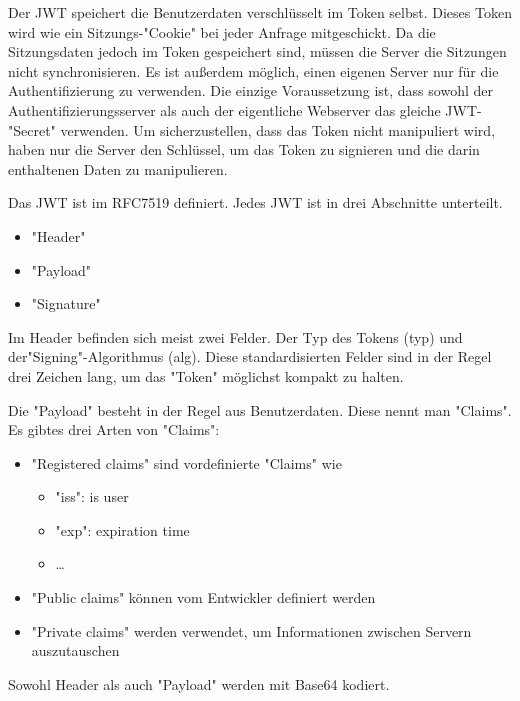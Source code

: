\label{sec:jwt}

Der JWT speichert die Benutzerdaten verschlüsselt im Token selbst. Dieses Token wird wie ein Sitzungs-"Cookie" bei jeder Anfrage mitgeschickt. Da die Sitzungsdaten jedoch im Token gespeichert sind, müssen die Server die Sitzungen nicht synchronisieren. Es ist außerdem möglich, einen eigenen Server nur für die Authentifizierung zu verwenden. 
Die einzige Voraussetzung ist, dass sowohl der Authentifizierungsserver als auch der eigentliche Webserver das gleiche JWT-"Secret" verwenden. Um sicherzustellen, dass das Token nicht manipuliert wird, haben nur die Server den Schlüssel, um das Token zu signieren und die darin enthaltenen Daten zu manipulieren. 

Das JWT ist im RFC7519 definiert. Jedes JWT ist in drei Abschnitte unterteilt. 

\begin{itemize}
    \item "Header"
    \item "Payload"
    \item "Signature"
\end{itemize}

Im Header befinden sich meist zwei Felder. 
Der Typ des Tokens (typ) und der\linebreak"Signing"-Algorithmus (alg). 
Diese standardisierten Felder sind in der Regel drei Zeichen lang, um das "Token" möglichst kompakt zu halten.

Die "Payload" besteht in der Regel aus Benutzerdaten. Diese nennt man "Claims". Es gibtes drei Arten von "Claims": 

\begin{itemize}
    \item "Registered claims" sind vordefinierte "Claims" wie
    \begin{itemize}
        \item "iss": is user
        \item "exp":  expiration time
        \item …
    \end{itemize}
    \item "Public claims" können vom Entwickler definiert werden
    \item "Private claims" werden verwendet, um Informationen zwischen Servern auszutauschen
\end{itemize}

Sowohl Header als auch "Payload" werden mit Base64 kodiert.

